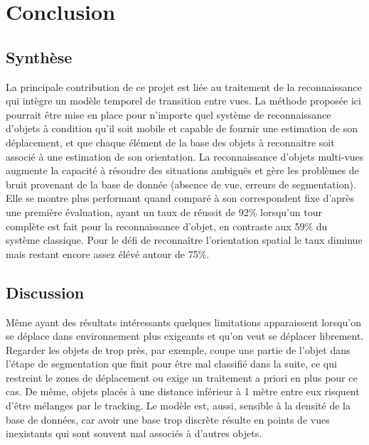 \chapter{Conclusion}

\section{Synthèse} 
La principale contribution de ce projet est liée au traitement de la reconnaissance qui intègre un modèle temporel de transition entre vues. La méthode proposée ici pourrait être mise en place pour n'importe quel système de reconnaissance d'objets à condition qu'il soit mobile et capable de fournir une estimation de son déplacement, et que chaque élément de la base des objets à reconnaitre soit associé à une estimation de son orientation. La reconnaissance d'objets multi-vues augmente la capacité à résoudre des situations ambiguës et gère les problèmes de bruit provenant de la base de donnée (absence de vue, erreurs de segmentation). Elle se montre plus performant quand comparé à son correspondent fixe d'après une première évaluation, ayant un taux de réussit de 92\% lorsqu'un tour complète est fait pour la reconnaissance d'objet, en contraste aux 59\% du système classique. Pour le défi de reconnaître l'orientation spatial le taux diminue mais restant encore assez élévé autour de 75\%.

\section{Discussion} 
Même ayant des résultats intéressants quelques limitations apparaissent lorsqu'on se déplace dans environnement plus exigeants et qu'on veut se déplacer librement. Regarder les objets de trop près, par exemple, coupe une partie de l'objet dans l'étape de segmentation que finit pour être mal classifié dans la suite, ce qui restreint le zones de déplacement ou exige un traitement a priori en plus pour ce cas. De même, objets placés à une distance inférieur à 1 mètre entre eux risquent d'être mélanges par le tracking. Le modèle est, aussi, sensible à la densité de la base de données, car avoir une base trop discrète résulte en points de vues inexistants qui sont souvent mal associés à d'autres objets. 

